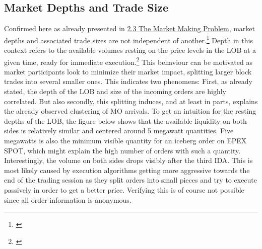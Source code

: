 \documentclass[12pt,a4paper]{cau_thesis}
\begin{document}
\subsection{Market Depths and Trade Size}\label{sub_sec:market_depths_and_trade_size}
Confirmed here as already presented in
\hyperref[sec:market_making_problem]{2.3 The Market Making Problem},
market depths and associated trade sizes are not independent of
another.\footnote{\cite[See ][, p.80]{cartea2015algorithmic}} Depth
in this context refers to the available volumes resting on the price
levels in the LOB at a given time, ready for immediate
execution.\footnote{\cite[See ][, p.79]{cartea2015algorithmic}} This
behaviour can be motivated as market participants look to minimize
their market impact, splitting larger block trades into several
smaller ones. This indicates two phenomens: First, as already stated,
the depth of the LOB and size of the incoming orders are highly
correlated. But also secondly, this splitting induces, and at least
in parts, explains the already observed clustering of MO arrivals. To
get an intuition for the resting depths of the LOB, the figure below
shows that the available liquidity on both sides is relatively
similar and centered around 5 megawatt quantities. Five megawatts is
also the minimum visible quantity for an iceberg order on EPEX SPOT,
which might explain the high number of orders with such a quantity.
Interestingly, the volume on both sides drops visibly after the third
IDA. This is most likely caused by execution algorithms getting more
aggressive towards the end of the trading session as they split
orders into small pieces and try to execute passively in order to get
a better price. Verifying this is of course not possible since all
order information is anonymous.
\begin{figure}[htbp]
    \vspace*{0.5cm}
    \centering
    \label{fig:lob_depth_top_of_book}
\end{figure}
\end{document}
